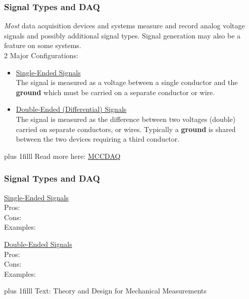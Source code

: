 \documentclass[fleqn]{beamer} %
\newcommand{\sectionIIsubsectionItitle}{Signal Types and DAQ}
\newcommand{\btVFill}{\vskip0pt plus 1filll}
\begin{document}
		    \begin{frame}[label=sectionIIsubsectionI]
				\frametitle{\sectionIIsubsectionItitle} \scriptsize

				{\it Most} data acquisition devices and systems measure and record {\BL analog} voltage signals and possibly additional signal types. Signal {\GR generation} may also be a feature on some systems. \vspace{5mm}\\

					2 Major Configurations:
					\begin{itemize}
						\item
						\underline{Single-Ended Signals} \vspace{0mm}\\
						The signal is measured as a voltage between a {\PR single} conductor and the {\bf ground} which must be carried on a separate conductor or wire. \vspace{10mm}\\
					
						\item
						\underline{Double-Ended (Differential) Signals} \vspace{0mm}\\			
						The signal is measured as the {\PN difference} between two voltages ({\PN double}) carried on separate conductors, or wires. Typically a {\bf ground} is shared between the two devices requiring a third conductor. 
					\end{itemize}
				
					\btVFill
					\tiny{Read more here: \href{https://www.mccdaq.com/TechTips/TechTip-4.aspx}{MCCDAQ}}

			\end{frame}	

			 \begin{frame}[label=sectionIIsubsectionI]
				\frametitle{\sectionIIsubsectionItitle} \scriptsize

				\begin{multicols}{2}
					\underline{Single-Ended Signals} \vspace{10mm}\\
					
					Pros:\vspace{10mm}\\
					Cons:\vspace{10mm}\\
					Examples:
					
					\underline{Double-Ended Signals} \vspace{10mm}\\
					
					Pros:\vspace{10mm}\\
					Cons:\vspace{10mm}\\
					Examples:
					
					
				\end{multicols}
				\btVFill
				\tiny{Text: Theory and Design for Mechanical Measurements}
			\end{frame}
\end{document}
